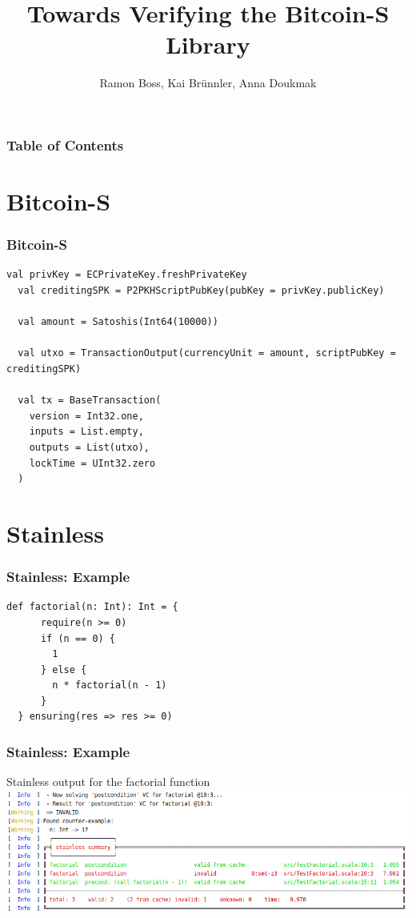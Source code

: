 \documentclass{beamer}
\begin{document}
\title{Towards Verifying the Bitcoin-S Library}

\author{Ramon Boss, Kai Brünnler, Anna Doukmak}


\frame{\titlepage}


\begin{frame}
  \frametitle{Table of Contents}
  \tableofcontents
\end{frame}


\section{Bitcoin-S}

\begin{frame}[fragile]
  \frametitle{Bitcoin-S}
\begin{lstlisting}[style=scala]
  val privKey = ECPrivateKey.freshPrivateKey
  val creditingSPK = P2PKHScriptPubKey(pubKey = privKey.publicKey)

  val amount = Satoshis(Int64(10000))

  val utxo = TransactionOutput(currencyUnit = amount, scriptPubKey = creditingSPK)

  val tx = BaseTransaction(
    version = Int32.one,
    inputs = List.empty,
    outputs = List(utxo),
    lockTime = UInt32.zero
  )
\end{lstlisting}
\end{frame}




\section{Stainless}


\begin{frame}[fragile]
\frametitle{Stainless: Example}
\begin{lstlisting}[style=scala]
  def factorial(n: Int): Int = {
      require(n >= 0)
      if (n == 0) {
        1
      } else {
        n * factorial(n - 1)
      }
  } ensuring(res => res >= 0)
\end{lstlisting}
\end{frame}



\begin{frame}[fragile]
\frametitle{Stainless: Example}
\begin{block}{Stainless output for the factorial function}
  \medskip
	\centering
		\includegraphics[width=\textwidth]{output1.png}
  \end{block}
\end{frame}
\end{document}

